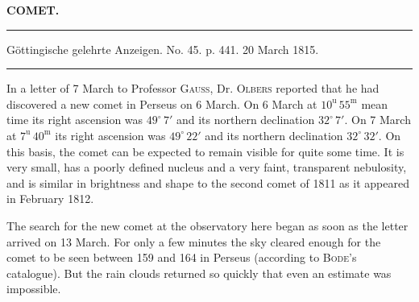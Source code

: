 \clearpage{}
\begin{center}\textbf{COMET.}\par\vspace{4pt}\hrule\vspace{4pt}\fontsize{10}{12}\selectfont Göttingische gelehrte Anzeigen. No. 45. p. 441. 20 March 1815.\par\vspace{4pt}\hrule\vspace{4pt}\end{center}

\par\indent In a letter of 7 March to Professor \textsc{Gauss}, Dr. \textsc{Olbers} reported that he had discovered a new comet in Perseus on 6 March. On 6 March at $10^{\mathrm u}\,55^{\mathrm m}$ mean time its right ascension was $49^\circ\,7'$ and its northern declination $32^\circ\,7'$. On 7 March at $7^{\mathrm u}\,40^{\mathrm m}$ its right ascension was $49^\circ\,22'$ and its northern declination $32^\circ\,32'$. On this basis, the comet can be expected to remain visible for quite some time. It is very small, has a poorly defined nucleus and a very faint, transparent nebulosity, and is similar in brightness and shape to the second comet of 1811 as it appeared in February 1812.

\par\indent The search for the new comet at the observatory here began as soon as the letter arrived on 13 March. For only a few minutes the sky cleared enough for the comet to be seen between 159 and 164 in Perseus (according to \textsc{Bode}’s catalogue). But the rain clouds returned so quickly that even an estimate was impossible.
